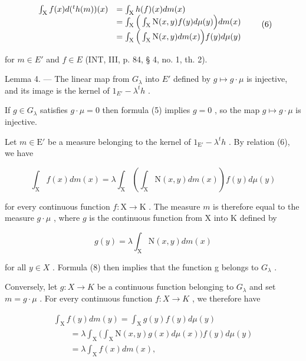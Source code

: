 \[
\begin{array}{r l} \int_ {\mathrm{X}} f (x) d (^ {t} h (m)) (x) & = \int_ {\mathrm{X}} h (f) (x) d m (x) \\ & = \int_ {\mathrm{X}} \Big (\int_ {\mathrm{X}} \mathrm{N} (x, y) f (y) d \mu (y) \Big) d m (x) \\ & = \int_ {\mathrm{X}} \Big (\int_ {\mathrm{X}} \mathrm{N} (x, y) d m (x) \Big) f (y) d \mu (y) \end{array}\tag{6}
\]

for \(m \in E'\) and \(f \in E\) (INT, III, p. 84, § 4, no. 1, th. 2).

Lemma 4. --- The linear map from \(G_{\lambda}\) into \(E'\) defined by \(g \mapsto g \cdot \mu\) is injective, and its image is the kernel of \(1_{E'} - \lambda^{t}h\) .

If \(g \in G_{\lambda}\) satisfies \(g \cdot \mu = 0\) then formula (5) implies \(g = 0\) , so the map \(g \mapsto g \cdot \mu\) is injective.

Let \(m \in \mathrm{E}'\) be a measure belonging to the kernel of \(1_{\mathrm{E}'} - \lambda^t h\) . By relation (6), we have

\[
\int_ {\mathrm{X}} f (x) d m (x) = \lambda \int_ {\mathrm{X}} \left(\int_ {\mathrm{X}} \mathrm{N} (x, y) d m (x)\right) f (y) d \mu (y)\tag{7}
\]

for every continuous function \(f: \mathrm{X} \to \mathrm{K}\) . The measure \(m\) is therefore equal to the measure \(g \cdot \mu\) , where \(g\) is the continuous function from \(\mathrm{X}\) into \(\mathrm{K}\) defined by

\[
g (y) = \lambda \int_ {\mathrm{X}} \mathrm{N} (x, y) d m (x)\tag{8}
\]

for all \(y \in X\) . Formula (8) then implies that the function g belongs to \(G_{\lambda}\) .

Conversely, let \(g: X \to K\) be a continuous function belonging to \(G_{\lambda}\) and set \(m = g \cdot \mu\) . For every continuous function \(f: X \to K\) , we therefore have

\[
\begin{array}{l} \int_ {\mathrm{X}} f (y) d m (y) = \int_ {\mathrm{X}} g (y) f (y) d \mu (y) \\ \qquad = \lambda \int_ {\mathrm{X}} \Big (\int_ {\mathrm{X}} \mathrm{N} (x, y) g (x) d \mu (x) \Big) f (y) d \mu (y) \\ \qquad = \lambda \int_ {\mathrm{X}} f (x) d m (x), \end{array}
\]

